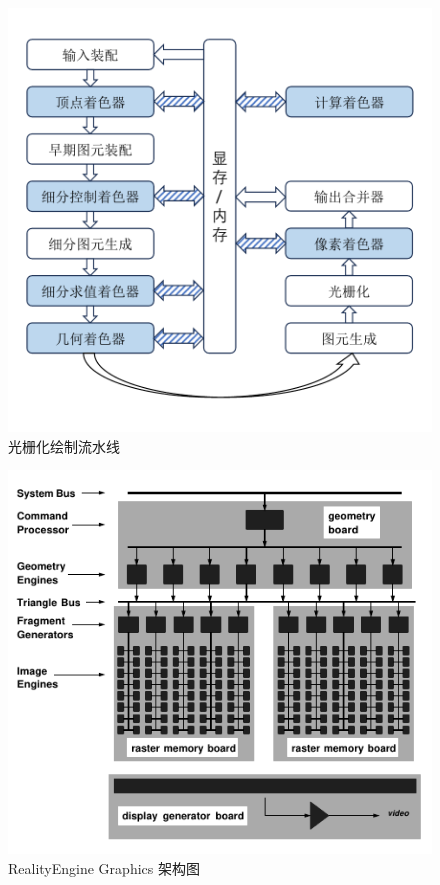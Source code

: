 \begin{figure}
    \centering
    \includegraphics[page=1, width=\linewidth]{figures/pictures.pdf}
    \caption{光栅化绘制流水线}
    \label{fig:rasterize_pipeline}
\end{figure}


\begin{figure}
    \centering
    \includegraphics[width=1.0\linewidth]{figures/RealityGraphics-Page2-Crop.pdf}
    \caption{RealityEngine Graphics 架构图\cite{RealityEngineSGI}}
    \label{fig:reality_engine_graphics}
\end{figure}

